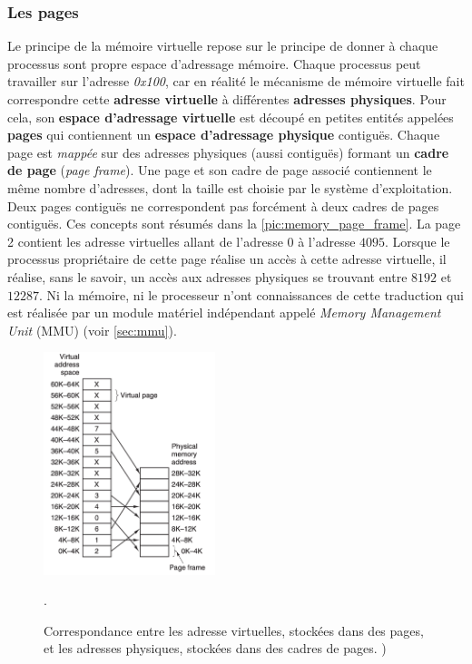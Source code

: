 \subsubsection{Les pages}
Le principe de la mémoire virtuelle repose sur le principe de donner à chaque processus sont propre espace d'adressage mémoire. Chaque processus peut travailler sur l'adresse \textit{0x100}, car en réalité le mécanisme de mémoire virtuelle fait correspondre cette \textbf{adresse virtuelle} à différentes \textbf{adresses physiques}. Pour cela, son \textbf{espace d'adressage virtuelle} est découpé en petites entités appelées \textbf{pages} qui contiennent un \textbf{espace d'adressage physique} contiguës. Chaque page est \textit{mappée} sur des adresses physiques (aussi contiguës) formant un \textbf{cadre de page} (\textit{page frame}). Une page et son cadre de page associé contiennent le même nombre d'adresses, dont la taille est choisie par le système d'exploitation. Deux pages contiguës ne correspondent pas forcément à deux cadres de pages contiguës. Ces concepts sont résumés dans la \autoref{pic:memory_page_frame}. La page 2 contient les adresse virtuelles allant de l'adresse $0$ à l'adresse $4095$. Lorsque le processus propriétaire de cette page réalise un accès à cette adresse virtuelle, il réalise, sans le savoir, un accès aux adresses physiques se trouvant entre $8192$ et $12287$. Ni la mémoire, ni le processeur n'ont connaissances de cette traduction qui est réalisée par un module matériel indépendant appelé \textit{Memory Management Unit} (MMU) (voir \autoref{sec:mmu}). 

\begin{figure}
    \center
    \includegraphics[width=5cm]{images/memory_page_frame.png}
    \caption{\label{pic:memory_page_frame} Correspondance entre les adresse virtuelles, stockées dans des pages, et les adresses physiques, stockées dans des cadres de pages.  \cite{tanenbaum2008systeme})}.
\end{figure}


